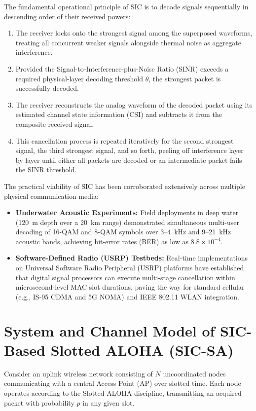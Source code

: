 The fundamental operational principle of SIC is to decode signals sequentially in descending order of their received powers:
\begin{enumerate}
    \item The receiver locks onto the strongest signal among the superposed waveforms, treating all concurrent weaker signals alongside thermal noise as aggregate interference.
    \item Provided the Signal-to-Interference-plus-Noise Ratio (SINR) exceeds a required physical-layer decoding threshold $\theta$, the strongest packet is successfully decoded.
    \item The receiver reconstructs the analog waveform of the decoded packet using its estimated channel state information (CSI) and subtracts it from the composite received signal.
    \item This cancellation process is repeated iteratively for the second strongest signal, the third strongest signal, and so forth, peeling off interference layer by layer until either all packets are decoded or an intermediate packet fails the SINR threshold.
\end{enumerate}

The practical viability of SIC has been corroborated extensively across multiple physical communication media:
\begin{itemize}
    \item \textbf{Underwater Acoustic Experiments:} Field deployments in deep water (120~m depth over a 20~km range) demonstrated simultaneous multi-user decoding of 16-QAM and 8-QAM symbols over 3--4~kHz and 9--21~kHz acoustic bands, achieving bit-error rates (BER) as low as $8.8 \times 10^{-4}$.
    \item \textbf{Software-Defined Radio (USRP) Testbeds:} Real-time implementations on Universal Software Radio Peripheral (USRP) platforms have established that digital signal processors can execute multi-stage cancellation within microsecond-level MAC slot durations, paving the way for standard cellular (e.g., IS-95 CDMA and 5G NOMA) and IEEE 802.11 WLAN integration.
\end{itemize}

\section{System and Channel Model of SIC-Based Slotted ALOHA (SIC-SA)}
Consider an uplink wireless network consisting of $N$ uncoordinated nodes communicating with a central Access Point (AP) over slotted time. Each node operates according to the Slotted ALOHA discipline, transmitting an acquired packet with probability $p$ in any given slot. 


